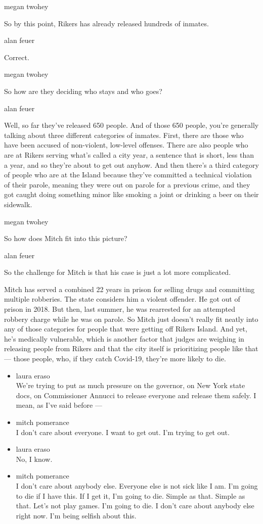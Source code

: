 megan twohey

So by this point, Rikers has already released hundreds of inmates.

alan feuer

Correct.

megan twohey

So how are they deciding who stays and who goes?

alan feuer

Well, so far they've released 650 people. And of those 650 people,
you're generally talking about three different categories of inmates.
First, there are those who have been accused of non-violent, low-level
offenses. There are also people who are at Rikers serving what's called
a city year, a sentence that is short, less than a year, and so they're
about to get out anyhow. And then there's a third category of people who
are at the Island because they've committed a technical violation of
their parole, meaning they were out on parole for a previous crime, and
they got caught doing something minor like smoking a joint or drinking a
beer on their sidewalk.

megan twohey

So how does Mitch fit into this picture?

alan feuer

So the challenge for Mitch is that his case is just a lot more
complicated.

Mitch has served a combined 22 years in prison for selling drugs and
committing multiple robberies. The state considers him a violent
offender. He got out of prison in 2018. But then, last summer, he was
rearrested for an attempted robbery charge while he was on parole. So
Mitch just doesn't really fit neatly into any of those categories for
people that were getting off Rikers Island. And yet, he's medically
vulnerable, which is another factor that judges are weighing in
releasing people from Rikers and that the city itself is prioritizing
people like that --- those people, who, if they catch Covid-19, they're
more likely to die.

\begin{itemize}
\item
  laura eraso\\
  We're trying to put as much pressure on the governor, on New York
  state docs, on Commissioner Annucci to release everyone and release
  them safely. I mean, as I've said before ---
\item
  mitch pomerance\\
  I don't care about everyone. I want to get out. I'm trying to get out.
\item
  laura eraso\\
  No, I know.
\item
  mitch pomerance\\
  I don't care about anybody else. Everyone else is not sick like I am.
  I'm going to die if I have this. If I get it, I'm going to die. Simple
  as that. Simple as that. Let's not play games. I'm going to die. I
  don't care about anybody else right now. I'm being selfish about this.
\end{itemize}


